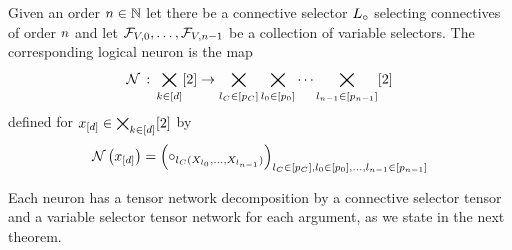 \begin{definition}
    \label{def:fsNeuron}
    Given an order $n\in\mathbb{N}$ let there be a connective selector $L_{\circ}$ selecting connectives of order $n$ and let $\mathcal{F}_{V,0},\ldots,\mathcal{F}_{V,n-1}$ be a collection of variable selectors.
    The corresponding logical neuron is the map
    \begin{align*}
        \mathcal{N}\,:\,\bigtimes_{k\in[d]}[2] \rightarrow \bigtimes_{l_{C}\in[p_{C}]} \bigtimes_{l_{0}\in[p_{0}]} \cdots \bigtimes_{l_{n-1}\in[p_{n-1}]} [2]
    \end{align*}
    defined for $x_{[d]}\in\bigtimes_{k\in[d]}[2]$ by
    \begin{align*}
        \mathcal{N}\left(x_{[d]}\right)
        = \left( \circ_{l_{C}(X_{l_{0}},\ldots,X_{l_{n-1}})}\right)_{l_{C}\in[p_{C}],l_{0}\in[p_{0}],\ldots,l_{n-1}\in[p_{n-1}]}
    \end{align*}
\end{definition}

Each neuron has a tensor network decomposition by a connective selector tensor and a variable selector tensor network for each argument, as we state in the next theorem.

